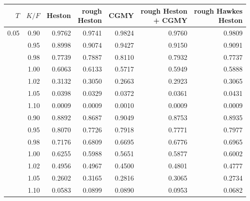 \begin{tabular}{rrrrrrr}
\toprule
$T$ & $K/F$ & Heston & \shortstack[r]{rough\\Heston} & CGMY & \shortstack[r]{rough Heston\\+ CGMY} & \shortstack[r]{rough Hawkes\\Heston}\\
\midrule
0.05 & 0.90 & 0.9762 & 0.9741 & 0.9824 & 0.9760 & 0.9809\\
 & 0.95 & 0.8998 & 0.9074 & 0.9427 & 0.9150 & 0.9091\\
 & 0.98 & 0.7739 & 0.7887 & 0.8110 & 0.7932 & 0.7737\\
 & 1.00 & 0.6063 & 0.6133 & 0.5717 & 0.5949 & 0.5888\\
 & 1.02 & 0.3132 & 0.3050 & 0.2663 & 0.2923 & 0.3065\\
 & 1.05 & 0.0398 & 0.0329 & 0.0372 & 0.0361 & 0.0431\\
 & 1.10 & 0.0009 & 0.0009 & 0.0010 & 0.0009 & 0.0009\\
\addlinespace
0.25 & 0.90 & 0.8892 & 0.8687 & 0.9049 & 0.8753 & 0.8935\\
 & 0.95 & 0.8070 & 0.7726 & 0.7918 & 0.7771 & 0.7977\\
 & 0.98 & 0.7176 & 0.6809 & 0.6695 & 0.6776 & 0.6965\\
 & 1.00 & 0.6255 & 0.5988 & 0.5651 & 0.5877 & 0.6002\\
 & 1.02 & 0.4956 & 0.4967 & 0.4500 & 0.4801 & 0.4777\\
 & 1.05 & 0.2602 & 0.3165 & 0.2816 & 0.3065 & 0.2734\\
 & 1.10 & 0.0583 & 0.0899 & 0.0890 & 0.0953 & 0.0682\\
\bottomrule
\end{tabular}
